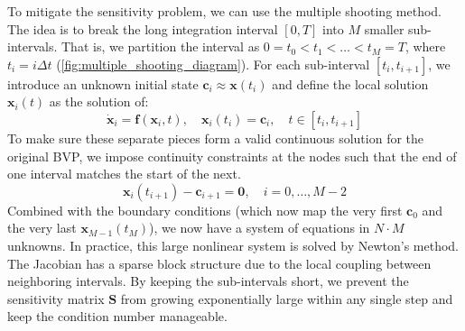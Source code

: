 To mitigate the sensitivity problem, we can use the multiple shooting method. The idea is to break the long integration interval $[0, T]$ into $M$ smaller sub-intervals. That is, we partition the interval as $0 = t_0 < t_1 < \dots < t_M = T$, where $t_i = i\Delta t$ (\autoref{fig:multiple_shooting_diagram}). For each sub-interval $[t_i, t_{i+1}]$, we introduce an unknown initial state $\mathbf{c}_i \approx \mathbf{x}(t_i)$ and define the local solution $\mathbf{x}_i(t)$ as the solution of:
\begin{equation}
    \dot{\mathbf{x}}_i = \mathbf{f}(\mathbf{x}_i, t), \quad \mathbf{x}_i(t_i) = \mathbf{c}_i, \quad t \in [t_i, t_{i+1}]
\end{equation}
To make sure these separate pieces form a valid continuous solution for the original BVP, we impose continuity constraints at the nodes such that the end of one interval matches the start of the next.
\begin{equation}
    \mathbf{x}_i(t_{i+1}) - \mathbf{c}_{i+1} = \mathbf{0}, \quad i = 0, \dots, M-2
\end{equation}
Combined with the boundary conditions (which now map the very first $\mathbf{c}_0$ and the very last $\mathbf{x}_{M-1}(t_M)$), we now have a system of equations in $N \cdot M$ unknowns. In practice, this large nonlinear system is solved by Newton's method. The Jacobian has a sparse block structure due to the local coupling between neighboring intervals. By keeping the sub-intervals short, we prevent the sensitivity matrix $\mathbf{S}$ from growing exponentially large within any single step and keep the condition number manageable.

